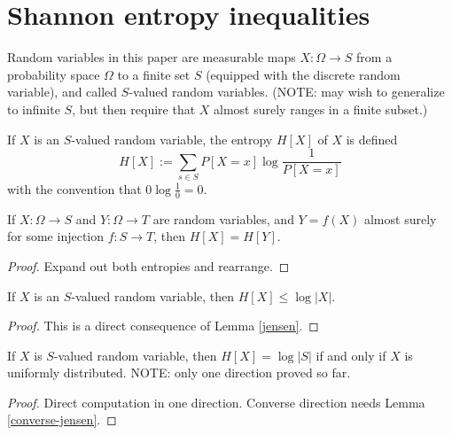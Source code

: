 \chapter{Shannon entropy inequalities}

Random variables in this paper are measurable maps $X : \Omega \to S$ from a probability space $\Omega$ to a finite set $S$ (equipped with the discrete random variable), and called $S$-valued random variables.
(NOTE: may wish to generalize to infinite $S$, but then require that $X$ almost surely ranges in a finite subset.)

\begin{definition}[Entropy]
  \label{entropy-def}
  \leanok
  If $X$ is an $S$-valued random variable, the entropy $H[X]$ of $X$ is defined
  $$ H[X] := \sum_{s \in S} P[X=x] \log \frac{1}{P[X=x]}$$
  with the convention that $0 \log \frac{1}{0} = 0$.
\end{definition}

\begin{lemma}\label{relabeled-entropy}   If $X: \Omega \to S$ and $Y: \Omega \to T$ are random variables, and $Y = f(X)$ almost surely for some injection $f: S \to T$, then $H[X] = H[Y]$.
\end{lemma}

\begin{proof} Expand out both entropies and rearrange.
\end{proof}

\begin{lemma}\label{jensen-bound}
\leanok
If $X$ is an $S$-valued random variable, then $H[X] \leq \log |X|$.
\end{lemma}

\begin{proof}\leanok
  This is a direct consequence of Lemma \ref{jensen}.
\end{proof}

\begin{lemma}\label{uniform-entropy}
If $X$ is $S$-valued random variable, then $H[X] = \log |S|$ if and only if $X$ is uniformly distributed. NOTE: only one direction proved so far.
\end{lemma}

\begin{proof}  Direct computation in one direction.  Converse direction needs Lemma \ref{converse-jensen}.
\end{proof}

